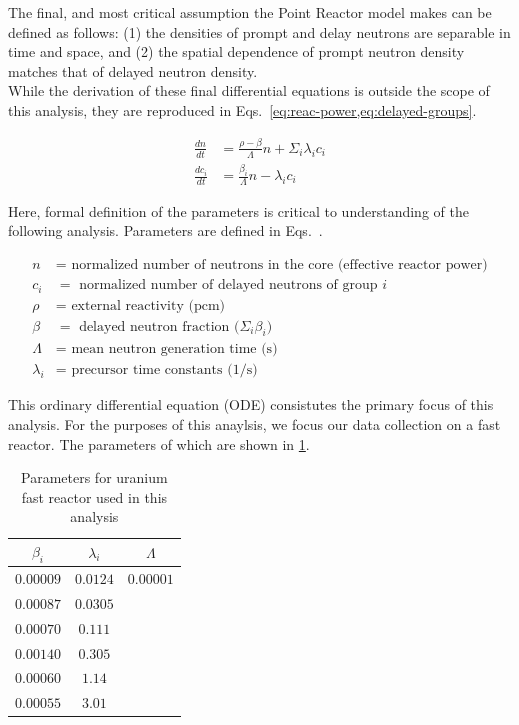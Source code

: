 \documentclass[review,onefignum,onetabnum]{siamart171218}
\begin{document}
The final, and most critical assumption the Point Reactor model makes can be
defined as follows: (1) the densities of prompt and delay neutrons are separable
in time and space, and (2) the spatial dependence of prompt neutron density matches
that of delayed neutron density. \\

While the derivation of these final differential equations is outside the scope
of this analysis, they are reproduced in Eqs.~\cref{eq:reac-power,eq:delayed-groups}.

\begin{align}
  \label{eq:reac-power}
  \frac{dn}{dt} &= \frac{\rho - \beta}{\Lambda}n + \Sigma_i\lambda_i c_i \\
  \label{eq:delayed-groups}
  \frac{dc_i}{dt} &= \frac{\beta_i}{\Lambda}n - \lambda_i c_i
\end{align}

Here, formal definition of the parameters is critical to understanding of the
following analysis. Parameters are defined in Eqs.~.

\begin{align}
  \label{eq:param_1}
  n &= \text{ normalized number of neutrons in the core (effective reactor power)} \\
  \label{eq:param_2}
  c_i &= \text{ normalized number of delayed neutrons of group $i$} \\
  \label{eq:param_3}
  \rho &= \text{ external reactivity (pcm) } \\
  \label{eq:param_4}
  \beta &= \text{ delayed neutron fraction ($\Sigma_i \beta_i$) } \\
  \label{eq:param_5}
  \Lambda &= \text{ mean neutron generation time (s)} \\
  \label{eq:param_6}
  \lambda_i &= \text{ precursor time constants (1/s)}
\end{align}

This ordinary differential equation (ODE) consistutes the primary focus of this
analysis. \cite{Dynamics}
For the purposes of this anaylsis, we focus our data collection on a 
fast reactor. The parameters of which are shown in \cref{tab:reactor_params}.
\begin{table}
  \begin{center}
    \begin{tabular}{c|c|c}
      $\beta_i$&$\lambda_i$&$\Lambda$\\
      \hline
      $0.00009$&$0.0124$&$0.00001$\\
      $0.00087$&$0.0305$&\\
      $0.00070$&$0.111$&\\
      $0.00140$&$0.305$&\\
      $0.00060$&$1.14$&\\
      $0.00055$&$3.01$&\\
    \end{tabular}
    \caption{Parameters for uranium fast reactor used in this analysis}
    \label{tab:reactor_params}
  \end{center}
\end{table}
\end{document}
